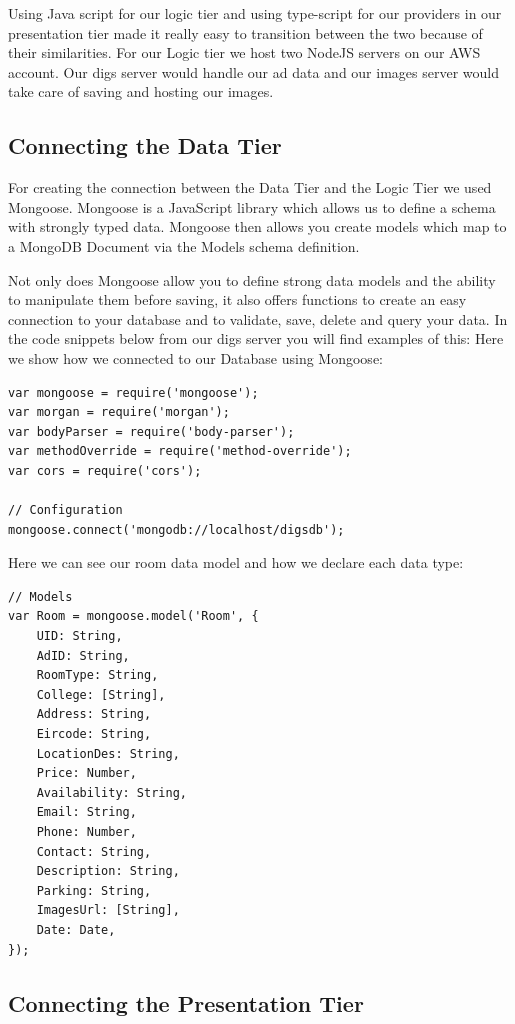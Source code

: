 Using Java script for our logic tier and using type-script for our providers in our presentation tier made it really easy to transition between the two because of their similarities. For our Logic tier we host two NodeJS servers on our AWS account. Our digs server would handle our ad data and our images server would take care of saving and hosting our images.

\subsection{Connecting the Data Tier}

For creating the connection between the Data Tier and the Logic Tier we used Mongoose. Mongoose is a JavaScript library which allows us to define a schema with strongly typed data. Mongoose then allows you create models which map to a MongoDB Document via the Models schema definition.\cite{Mongoose}

Not only does Mongoose allow you to define strong data models and the ability to manipulate them before saving, it also offers functions to create an easy connection to your database and to validate, save, delete and query your data. In the code snippets below from our digs server you will find examples of this:
Here we show how we connected to our Database using Mongoose:

\begin{verbatim}
var mongoose = require('mongoose');     
var morgan = require('morgan');             
var bodyParser = require('body-parser');    
var methodOverride = require('method-override'); 
var cors = require('cors');
 
// Configuration
mongoose.connect('mongodb://localhost/digsdb');
\end{verbatim}

\noindent Here we can see our room data model and how we declare each data type:

\begin{verbatim}
// Models
var Room = mongoose.model('Room', {
    UID: String,
    AdID: String,
    RoomType: String,
	College: [String],
	Address: String,
    Eircode: String,
    LocationDes: String,
    Price: Number,
    Availability: String,
    Email: String,
    Phone: Number,
    Contact: String,
    Description: String,
    Parking: String,
	ImagesUrl: [String],
	Date: Date,
});
\end{verbatim}

\subsection{Connecting the Presentation Tier}

